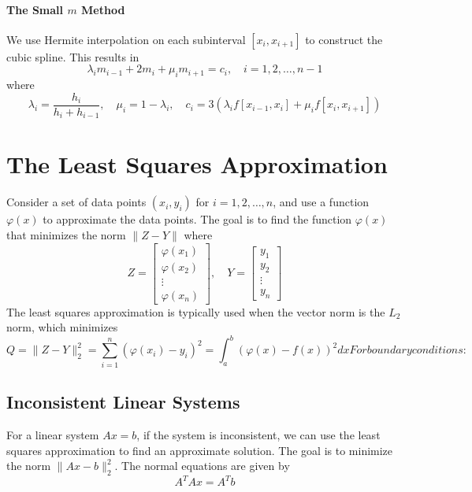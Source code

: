 \documentclass{matharticle}
\begin{document}
\paragraph{The Small $m$ Method}
We use Hermite interpolation on each subinterval $[x_i, x_{i+1}]$ to construct the cubic spline. This results in
\begin{equation}
	\lambda_i m_{i-1} + 2 m_i + \mu_i m_{i+1} = c_i, \quad i = 1, 2, \ldots, n-1
\end{equation}
where
\begin{equation}
	\lambda_i = \frac{h_i}{h_i + h_{i-1}}, \quad \mu_i = 1 - \lambda_i, \quad c_i = 3 \left( \lambda_i f[x_{i-1}, x_i] + \mu_i f[x_i, x_{i+1}] \right)
\end{equation}

\section{The Least Squares Approximation}
Consider a set of data points $(x_i, y_i)$ for $i = 1, 2, \ldots, n$, and use a function $\varphi(x)$ to approximate the data points. The goal is to find the function $\varphi(x)$ that minimizes the norm $\| Z - Y \|$ where
\begin{equation}
	Z = \begin{bmatrix}
		\varphi(x_1) \\
		\varphi(x_2) \\
		\vdots       \\
		\varphi(x_n)
	\end{bmatrix}, \quad Y = \begin{bmatrix}
		y_1    \\
		y_2    \\
		\vdots \\
		y_n
	\end{bmatrix}
\end{equation}
The least squares approximation is typically used when the vector norm is the $L_2$ norm, which minimizes
\begin{equation}
	Q = \| Z - Y \|_2^2 = \sum_{i=1}^{n} (\varphi(x_i) - y_i)^2 = \int_{a}^{b} (\varphi(x) - f(x))^2 dx
	For boundary conditions:
\end{equation}

\subsection{Inconsistent Linear Systems}
For a linear system $Ax = b$, if the system is inconsistent, we can use the least squares approximation to find an approximate solution. The goal is to minimize the norm $\| Ax - b \|_2^2$. The normal equations are given by
\begin{equation}
	A^T A x = A^T b
\end{equation}
\end{document}
